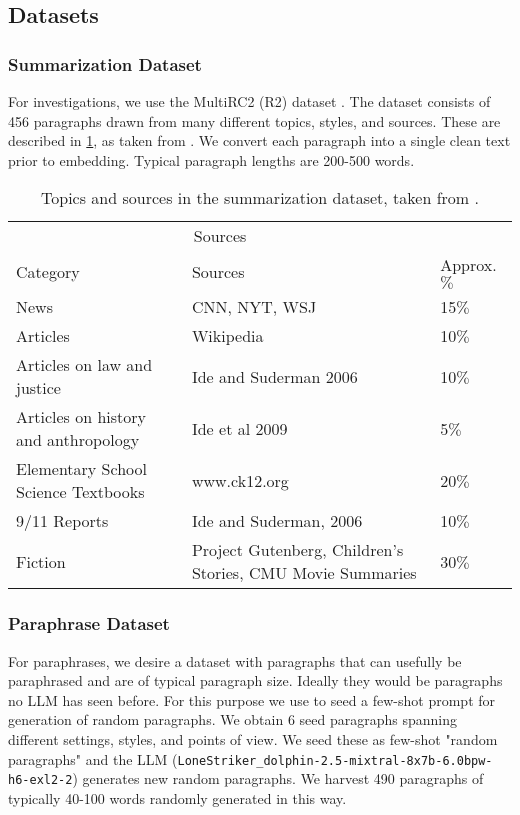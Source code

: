 \documentclass{article}
\begin{document}
\subsection{Datasets}

\subsubsection{Summarization Dataset}
For investigations, we use the MultiRC2 (R2) dataset \citet{multirc2}.
The dataset consists of 456 paragraphs drawn from many different topics, styles, and sources.
These are described in \ref{tab:summarizationdataset}, as taken from \citet{multirc2}.
We convert each paragraph into a single clean text prior to embedding.
Typical paragraph lengths are 200-500 words.

\begin{table}
	\caption{Topics and sources in the summarization dataset, taken from \cite{multirc2}.}
	\centering
	\begin{tabular}{lll}
		\toprule
		\multicolumn{2}{c}{Sources}                   \\
		\cmidrule(r){1-2}
		Category     & Sources     & Approx. $\%$ \\
		\midrule
		News  	 	& CNN, NYT, WSJ & 15$\%$    \\
		Articles	& Wikipedia		& 10$\%$    \\
		Articles on law and justice	& Ide and Suderman 2006 & 10$\%$\\
		Articles on history and anthropology 	& Ide et al 2009	& 5$\%$ \\
		Elementary School Science Textbooks	& www.ck12.org	& 20$\%$\\
		9/11 Reports	& Ide and Suderman, 2006	& 10$\%$ \\
		Fiction		& Project Gutenberg, Children's Stories, CMU Movie Summaries & 30$\%$\\
		
		\bottomrule
	\end{tabular}
	\label{tab:summarizationdataset}
\end{table}

\subsubsection{Paraphrase Dataset}

For paraphrases, we desire a dataset with paragraphs that can usefully be paraphrased and are of typical paragraph size. 
Ideally they would be paragraphs no LLM has seen before.
For this purpose we use \citet*{randomparagraphs} to seed a few-shot prompt for generation of random paragraphs.
We obtain 6 seed paragraphs spanning different settings, styles, and points of view.  
We seed these as few-shot "random paragraphs" and the LLM  (\texttt{LoneStriker\_dolphin-2.5-mixtral-8x7b-6.0bpw-h6-exl2-2}) generates new random paragraphs.
We harvest 490 paragraphs of typically 40-100 words randomly generated in this way. 
\end{document}
